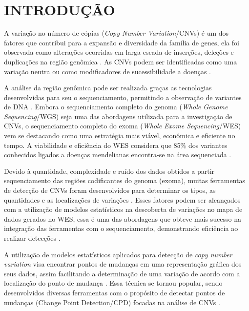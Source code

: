 
\chapter{INTRODUÇÃO}
\label{chap:introducao}

A variação no número de cópias (\textit{Copy Number Variation}/CNVs) é um dos fatores que contribui para a expansão e diversidade da família de genes, ela foi observada como alterações ocorridas em larga escada de inserções, deleções e duplicações na região genômica \cite{Perry2009,Zhao2013,Redon2006,Costain2016}. 
As CNVs podem ser identificadas como uma variação neutra ou como modificadores de sucessibilidade a doenças \cite{Costain2016,Perry2009}.

A análise da região genômica pode ser realizada graças as tecnologias desenvolvidas para seu o sequenciamento, permitindo a observação de variantes de DNA \cite{Sathirapongsasuti2011}.
Embora o sequenciamento completo do genoma (\textit{Whole Genome Sequencing}/WGS) seja uma das abordagens utilizada para a investigação de CNVs, o sequenciamento completo do exoma (\textit{Whole Exome Sequencing}/WES) vem se destacando como uma estratégia mais viável, econômica e eficiente no tempo. A viabilidade e eficiência do WES considera que 85\% dos variantes conhecidos ligados a doenças mendelianas encontra-se na área sequenciada \cite{Chong2015,Sathirapongsasuti2011,Fromer2012}.

Devido à quantidade, complexidade e ruído dos dados obtidos a partir sequenciamento das regiões codificantes do genoma (exoma), muitas ferramentas de detecção de CNVs foram desenvolvidos para determinar os tipos, as quantidades e as localizações de variações \cite{Fromer2012,Tan2014}. Esses fatores podem ser alcançados com a utilização de modelos estatísticos na descoberta de variações no mapa de dados gerados no WES, essa é uma das abordagens que obteve mais sucesso na integração das ferramentas com o sequenciamento, demonstrando eficiência ao realizar detecções \cite{Tan2014}.

A utilização de modelos estatísticos aplicados para detecção de \textit{copy number variation} visa encontrar pontos de mudanças em uma representação gráfica dos seus dados, assim facilitando a determinação de uma variação de acordo com a localização do ponto de mudança \cite{Zhao2013}. Essa técnica se tornou popular, sendo desenvolvidos diversas ferramentas com o propósito de detectar pontos de mudanças (Change Point Detection/CPD) focadas na análise de CNVs \cite{Olshen2004,Baldi2001,Girimurugan2018,Picard2011,Plagnol2012,Muggeo2010}.

